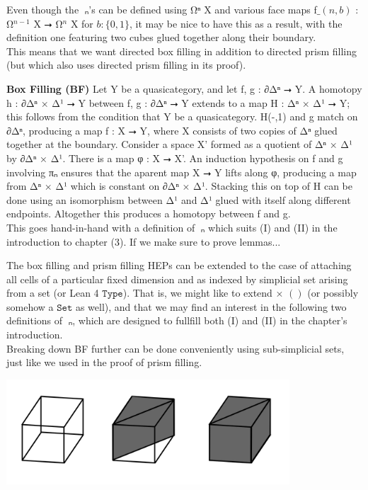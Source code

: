 \documentclass{book}
\theoremstyle{definition}
\begin{document}
Even though the π⃗ₙ's can be defined using Ω⃗ⁿ X and various face maps f$\_(n,b)$ : Ω⃗${}^{n-1}$ X ⭢ Ω⃗${}^{n}$ X for $b : \{ 0, 1 \}$, it may be nice to have this as a result, with the definition one featuring two cubes glued together along their boundary.\\

This means that we want directed box filling in addition to directed prism filling (but which also uses directed prism filling in its proof).

{\bf Box Filling (BF)} Let Y be a quasicategory, and let f, g : ∂Δⁿ ⭢ Y. A homotopy h : ∂Δⁿ × Δ¹ ⭢ Y between f, g : ∂Δⁿ ⭢ Y extends to a map H : Δⁿ × Δ¹ ⭢ Y; this follows from the condition that Y be a quasicategory. H(-,1) and g match on ∂Δⁿ, producing a map f : X ⭢ Y, where X consists of two copies of Δⁿ glued together at the boundary. Consider a space X' formed as a quotient of Δⁿ × Δ¹ by ∂Δⁿ × Δ¹. There is a map φ : X ⭢ X'. An induction hypothesis on f and g involving πₙ ensures that the aparent map X ⭢ Y lifts along φ, producing a map from Δⁿ × Δ¹ which is constant on ∂Δⁿ × Δ¹. Stacking this on top of H can be done using an isomorphism between Δ¹ and Δ¹ glued with itself along different endpoints. Altogether this produces a homotopy between f and g.\\

This goes hand-in-hand with a definition of π⃗ₙ which suits (I) and (II) in the introduction to chapter (3). If we make sure to prove lemmas... 

The box filling and prism filling HEPs can be extended to the case of attaching all cells of a particular fixed dimension and as indexed by simplicial set arising from a set (or Lean 4 $\texttt{Type}$). That is, we might like to extend × $()$ (or possibly somehow a $\texttt{Set}$ as well), and that we may find an interest in the following two definitions of π⃗ₙ, which are designed to fullfill both (I) and (II) in the chapter's introduction.\\

Breaking down BF further can be done conveniently using sub-simplicial sets, just like we used in the proof of prism filling. 

\begin{center}
\includegraphics[width=300pt]{boxfilling.png}
\end{center}
\end{document}
